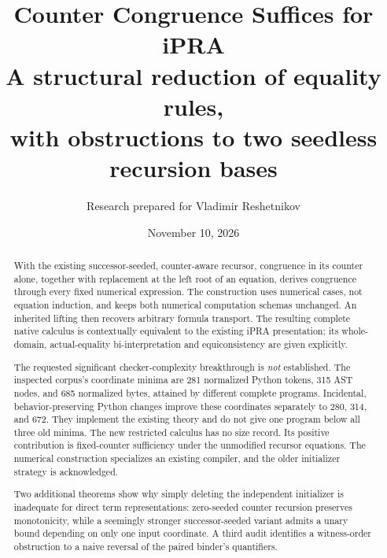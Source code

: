 \documentclass[11pt,letterpaper]{article}
\title{\color{ink}\textbf{Counter Congruence Suffices for iPRA}\\[0.5em]
 \large A structural reduction of equality rules,\\
 with obstructions to two seedless recursion bases}
\author{Research prepared for Vladimir Reshetnikov}
\date{November 10, 2026}
\theoremstyle{definition}\newtheorem{definition}[theorem]{Definition}
\theoremstyle{remark}\newtheorem{remark}[theorem]{Remark}
\begin{document}
\maketitle
\begin{abstract}
With the existing successor-seeded, counter-aware recursor, congruence in
its counter alone, together with replacement at the left root of an
equation, derives congruence through every fixed numerical expression.
The construction uses numerical cases, not equation induction, and keeps
both numerical computation schemas unchanged. An inherited lifting then
recovers arbitrary formula transport. The resulting complete native
calculus is contextually equivalent to the existing iPRA presentation;
its whole-domain, actual-equality bi-interpretation and equiconsistency
are given explicitly.

The requested significant checker-complexity breakthrough is \emph{not}
established. The inspected corpus's coordinate minima are 281 normalized
Python tokens, 315 AST nodes, and 685 normalized bytes, attained by
different complete programs. Incidental, behavior-preserving Python
changes improve these coordinates separately to 280, 314, and 672.
They implement the existing theory and do not give one program below
all three old minima. The new restricted calculus has no size record.
Its positive contribution is fixed-counter sufficiency under the
unmodified recursor equations. The numerical construction specializes
an existing compiler, and the older initializer strategy is acknowledged.

Two additional theorems show why simply deleting the independent
initializer is inadequate for direct term representations: zero-seeded
counter recursion preserves monotonicity, while a seemingly stronger
successor-seeded variant admits a unary bound depending on only one
input coordinate. A third audit identifies a witness-order obstruction
to a naive reversal of the paired binder's quantifiers.
\end{abstract}
\begin{center}
\end{center}
\clearpage
\setcounter{tocdepth}{2}
\begingroup\small\setlength{\parskip}{0pt}\tableofcontents\endgroup
\clearpage
\end{document}
